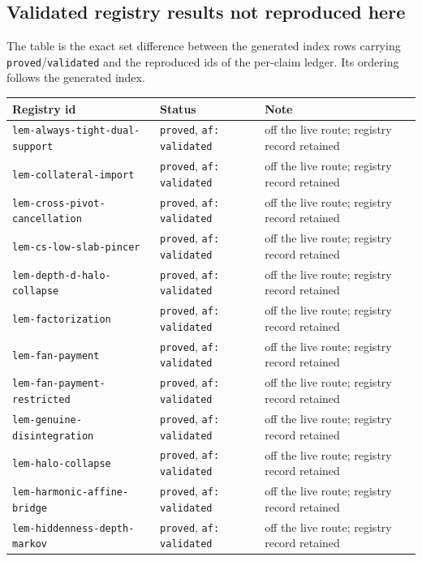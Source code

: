 \subsection*{Validated registry results not reproduced here}

The table is the exact set difference between the generated index rows carrying
\texttt{proved}/\texttt{validated} and the reproduced ids of the per-claim ledger. Its
ordering follows the generated index.

\begin{longtable}{@{}p{}p{}p{}@{}}
\toprule
Registry id & Status & Note \\
\midrule
\endhead
\texttt{lem-always-tight-dual-support} & \texttt{proved}, \texttt{af: validated} & off the live route; registry record retained \\
\texttt{lem-collateral-import} & \texttt{proved}, \texttt{af: validated} & off the live route; registry record retained \\
\texttt{lem-cross-pivot-cancellation} & \texttt{proved}, \texttt{af: validated} & off the live route; registry record retained \\
\texttt{lem-cs-low-slab-pincer} & \texttt{proved}, \texttt{af: validated} & off the live route; registry record retained \\
\texttt{lem-depth-d-halo-collapse} & \texttt{proved}, \texttt{af: validated} & off the live route; registry record retained \\
\texttt{lem-factorization} & \texttt{proved}, \texttt{af: validated} & off the live route; registry record retained \\
\texttt{lem-fan-payment} & \texttt{proved}, \texttt{af: validated} & off the live route; registry record retained \\
\texttt{lem-fan-payment-restricted} & \texttt{proved}, \texttt{af: validated} & off the live route; registry record retained \\
\texttt{lem-genuine-disintegration} & \texttt{proved}, \texttt{af: validated} & off the live route; registry record retained \\
\texttt{lem-halo-collapse} & \texttt{proved}, \texttt{af: validated} & off the live route; registry record retained \\
\texttt{lem-harmonic-affine-bridge} & \texttt{proved}, \texttt{af: validated} & off the live route; registry record retained \\
\texttt{lem-hiddenness-depth-markov} & \texttt{proved}, \texttt{af: validated} & off the live route; registry record retained \\

\end{longtable}
